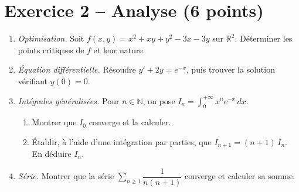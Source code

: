\documentclass[11pt,a4paper]{article}
\begin{document}
\section*{Exercice 2 -- Analyse (6 points)}
\begin{enumerate}
  \item \emph{Optimisation.} Soit $f(x,y) = x^2 + xy + y^2 - 3x - 3y$ sur $\mathbb{R}^2$.
  Déterminer les points critiques de $f$ et leur nature.
  \item \emph{Équation différentielle.} Résoudre $y' + 2y = e^{-x}$, puis trouver la solution vérifiant $y(0) = 0$.
  \item \emph{Intégrales généralisées.} Pour $n \in \mathbb{N}$, on pose $I_n = \displaystyle\int_0^{+\infty} x^n e^{-x}\,dx$.
  \begin{enumerate}[label=\alph*)]
    \item Montrer que $I_0$ converge et la calculer.
    \item Établir, à l'aide d'une intégration par parties, que $I_{n+1} = (n+1)\,I_n$. En déduire $I_n$.
  \end{enumerate}
  \item \emph{Série.} Montrer que la série $\sum_{n\geqslant1} \dfrac{1}{n(n+1)}$ converge et calculer sa somme.
\end{enumerate}
\end{document}
